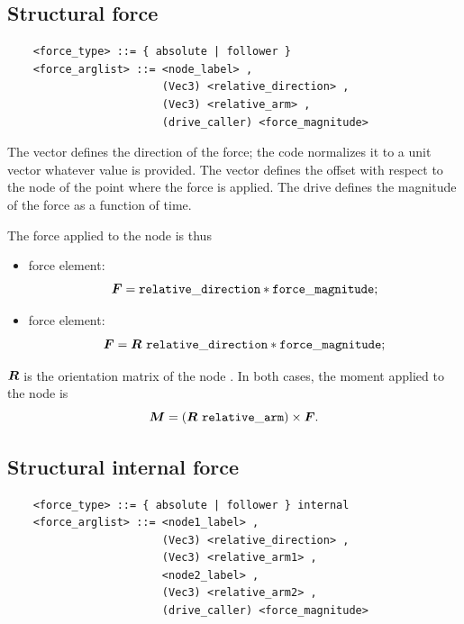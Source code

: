\subsection{Structural force}
\begin{verbatim}
    <force_type> ::= { absolute | follower } 
    <force_arglist> ::= <node_label> , 
                        (Vec3) <relative_direction> ,
                        (Vec3) <relative_arm> ,
                        (drive_caller) <force_magnitude>
\end{verbatim}
The vector  defines the direction of the force;
the code normalizes it to a unit vector whatever value is provided.
The vector  defines the offset with respect
to the node of the point where the force is applied.
The drive  defines the magnitude of the force
as a function of time.

The force applied to the node  is thus
\begin{itemize}
\item {} force element:
\begin{equation}
	\boldsymbol{F}
	= \mathtt{relative\_direction} * \mathtt{force\_magnitude} ;
\end{equation}

\item {} force element:
\begin{equation}
	\boldsymbol{F}
	= \boldsymbol{R} \ \mathtt{relative\_direction} * \mathtt{force\_magnitude} ;
\end{equation}
\end{itemize}
$\boldsymbol{R}$ is the orientation matrix of the node .
In both cases, the moment applied to the node  is
\begin{equation}
	\boldsymbol{M} = \left( \boldsymbol{R} \ \mathtt{relative\_arm} \right) \times \boldsymbol{F} .
\end{equation}

\subsection{Structural internal force}
\begin{verbatim}
    <force_type> ::= { absolute | follower } internal
    <force_arglist> ::= <node1_label> , 
                        (Vec3) <relative_direction> ,
                        (Vec3) <relative_arm1> ,
                        <node2_label> ,
                        (Vec3) <relative_arm2> ,
                        (drive_caller) <force_magnitude>
\end{verbatim}

